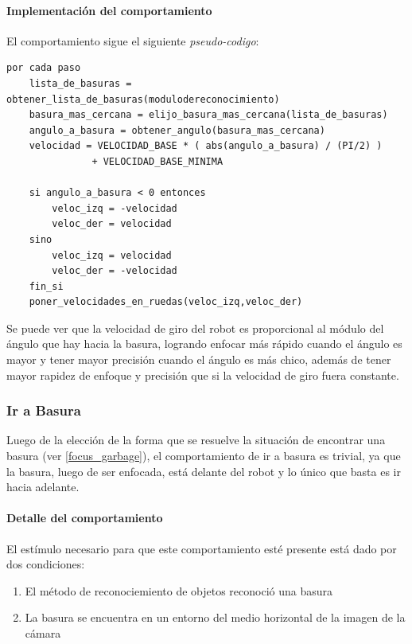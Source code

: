 \paragraph{Implementaci\'on del comportamiento}
\label{focus_garbage:impl}
El comportamiento sigue el siguiente \emph{pseudo-codigo}:
\begin{verbatim}
por cada paso
    lista_de_basuras = obtener_lista_de_basuras(modulodereconocimiento)
    basura_mas_cercana = elijo_basura_mas_cercana(lista_de_basuras)
    angulo_a_basura = obtener_angulo(basura_mas_cercana)
    velocidad = VELOCIDAD_BASE * ( abs(angulo_a_basura) / (PI/2) )
               + VELOCIDAD_BASE_MINIMA

    si angulo_a_basura < 0 entonces
        veloc_izq = -velocidad
        veloc_der = velocidad
    sino
        veloc_izq = velocidad
        veloc_der = -velocidad
    fin_si
    poner_velocidades_en_ruedas(veloc_izq,veloc_der)
\end{verbatim}

Se puede ver que la velocidad de giro del robot es proporcional al m\'odulo del \'angulo
que hay hacia la basura, logrando enfocar m\'as r\'apido cuando el \'angulo es mayor y
tener mayor precisi\'on cuando el \'angulo es m\'as chico, adem\'as de tener mayor rapidez
de enfoque y precisi\'on que si la velocidad de giro fuera constante.
\\

\subsubsection{Ir a Basura}
\label{go_to_garbage}
Luego de la elecci\'on de la forma que se resuelve la situaci\'on de encontrar una
basura (ver \ref{focus_garbage}), el comportamiento de ir a basura es trivial, ya
que la basura, luego de ser enfocada, est\'a delante del robot y lo \'unico que
basta es ir hacia adelante.

\paragraph{Detalle del comportamiento}
El est\'imulo necesario para que este comportamiento est\'e presente est\'a
dado por dos condiciones:
\begin{enumerate}
\item El m\'etodo de reconociemiento de objetos reconoci\'o una basura
\item La basura se encuentra en un entorno del medio horizontal de la imagen de la c\'amara
\end{enumerate}

